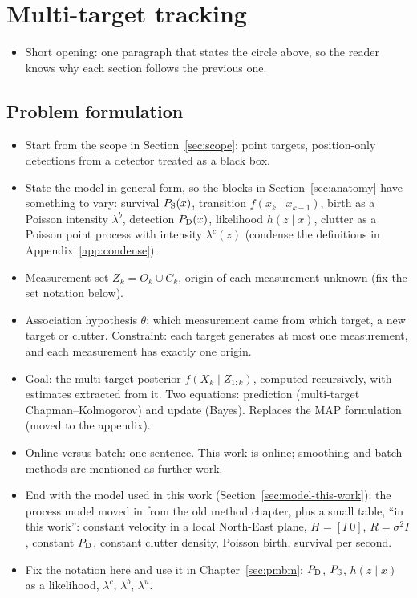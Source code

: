 \section{Multi-target tracking}
\label{sec:mtt-overview}
\label{sec:mtt}
\begin{itemize}
    \item Short opening: one paragraph that states the circle above, so the reader knows why each section follows the previous one.
\end{itemize}

\subsection{Problem formulation}
\label{sec:formulation}
\begin{itemize}
    \item Start from the scope in Section~\ref{sec:scope}: point targets, position-only detections from a detector treated as a black box.
    \item State the model in general form, so the blocks in Section~\ref{sec:anatomy} have something to vary: survival $P_{\mathrm{S}}(x)$, transition $f(x_k \mid x_{k-1})$, birth as a Poisson intensity $\lambda^b$, detection $P_{\mathrm{D}}(x)$, likelihood $h(z \mid x)$, clutter as a Poisson point process with intensity $\lambda^c(z)$ (condense the definitions in Appendix~\ref{app:condense}).
    \item Measurement set $Z_k = O_k \cup C_k$, origin of each measurement unknown (fix the set notation below).
    \item Association hypothesis $\theta$: which measurement came from which target, a new target or clutter. Constraint: each target generates at most one measurement, and each measurement has exactly one origin.
    \item Goal: the multi-target posterior $f(X_k \mid Z_{1:k})$, computed recursively, with estimates extracted from it. Two equations: prediction (multi-target Chapman--Kolmogorov) and update (Bayes). Replaces the MAP formulation (moved to the appendix).
    \item Online versus batch: one sentence. This work is online; smoothing and batch methods are mentioned as further work.
    \item End with the model used in this work (Section~\ref{sec:model-this-work}): the process model moved in from the old method chapter, plus a small table, ``in this work'': constant velocity in a local North-East plane, $H = [I\ 0]$, $R = \sigma^2 I$, constant $P_{\mathrm{D}}$, constant clutter density, Poisson birth, survival per second.
    \item Fix the notation here and use it in Chapter~\ref{sec:pmbm}: $P_{\mathrm{D}}$, $P_{\mathrm{S}}$, $h(z \mid x)$ as a likelihood, $\lambda^c$, $\lambda^b$, $\lambda^u$.
\end{itemize}

